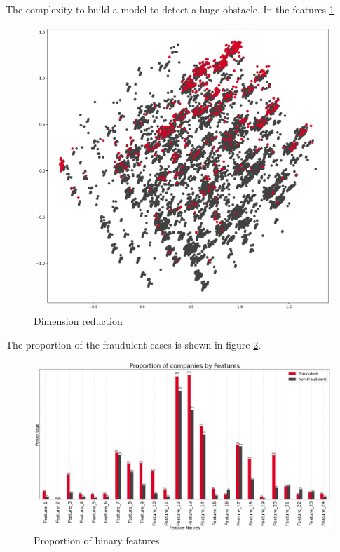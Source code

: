The complexity to build a model to detect a huge obstacle. In the features \ref{fig:Dimension reduction}
\begin{figure}[H]
    \centering
    \includegraphics[width=\linewidth]{figures/pca_2d.png}
    \caption{Dimension reduction}
    \label{fig:Dimension reduction}
\end{figure}
The proportion of the fraudulent cases is shown in figure \ref{fig:feature proportion}. 
\begin{figure}[H]
    \centering
    \includegraphics[width=\linewidth]{figures/feature_proportion.png}
    \caption{Proportion of binary features}
    \label{fig:feature proportion}
\end{figure}

